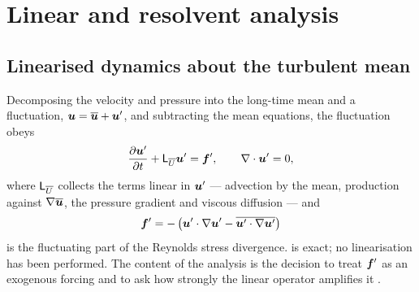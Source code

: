 %
\section{Linear and resolvent analysis}
\label{sec:resolvent}

\subsection{Linearised dynamics about the turbulent mean}
\label{sec:resolvent:linear}

Decomposing the velocity and pressure into the long-time mean and a fluctuation,
$\bm{u} = \overline{\bm{u}} + \bm{u}'$, and subtracting the mean equations,
the fluctuation obeys
\begin{equation}
  \frac{\partial \bm{u}'}{\partial t} + \mathsf{L}_{\overline{U}}\bm{u}' = \bm{f}' ,
  \qquad \nabla\cdot\bm{u}' = 0 ,
  \label{eq:lns}
\end{equation}
where $\mathsf{L}_{\overline{U}}$ collects the terms linear in $\bm{u}'$ ---
advection by the mean, production against $\nabla\overline{\bm{u}}$, the pressure
gradient and viscous diffusion --- and
\begin{equation}
  \bm{f}' = -\left( \bm{u}'\cdot\nabla\bm{u}'
                    - \overline{\bm{u}'\cdot\nabla\bm{u}'} \right)
  \label{eq:forcing-def}
\end{equation}
is the fluctuating part of the Reynolds stress divergence.  is
exact; no linearisation has been performed. The content of the analysis is the
decision to treat $\bm{f}'$ as an exogenous forcing and to ask how
strongly the linear operator amplifies it \citep{McKeonSharma2010}.


